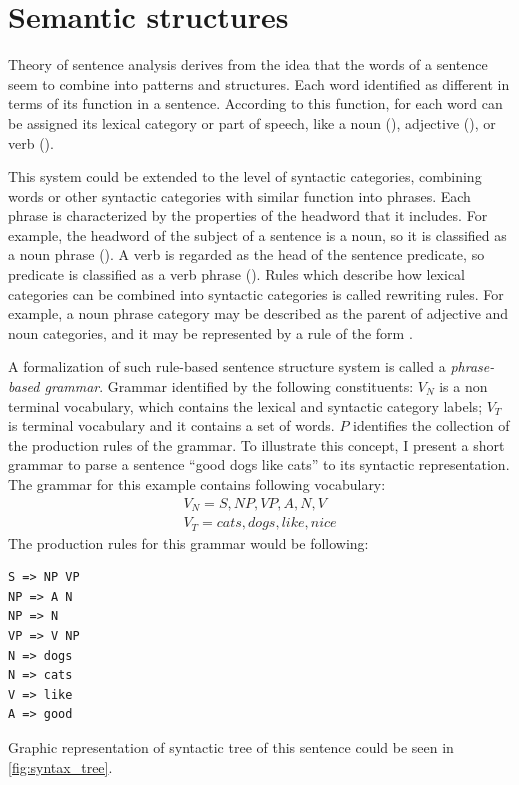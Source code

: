 \section{Semantic structures}
Theory of sentence analysis derives from the idea that the words of a sentence seem to combine into patterns and structures. Each word identified as different in terms of its function in a sentence. According to this function, for each word can be assigned its lexical category or part of speech, like a noun (), adjective (), or verb (). 

This system could be extended to the level of syntactic categories, combining words or other syntactic categories with similar function into phrases. Each phrase is characterized by the properties of the headword that it includes. For example, the headword of the subject of a sentence is a noun, so it is classified as a noun phrase (). A verb is regarded as the head of the sentence predicate, so predicate is classified as a verb phrase (). Rules which describe how lexical categories can be combined into syntactic categories is called rewriting rules. For example, a noun phrase category may be described as the parent of adjective and noun categories, and it may be represented by a rule of the form . 

A formalization of such rule-based sentence structure system is called a \emph{phrase-based grammar}. Grammar identified by the following constituents:
$V_N$ is a non terminal vocabulary, which contains the lexical and syntactic category labels;
$V_T$ is terminal vocabulary and it contains a set of words.
$P$ identifies the collection of the production rules of the grammar.
To illustrate this concept, I present a short grammar to parse a sentence "`good dogs like cats"' to its syntactic representation. The grammar for this example contains following vocabulary:
\begin{equation}
\begin{split}
V_N = {S, NP, VP, A, N, V}\\
V_T = {cats, dogs, like, nice}
\end{split}
\end{equation}
The production rules for this grammar would be following:
\begin{verbatim}
S => NP VP
NP => A N
NP => N
VP => V NP
N => dogs
N => cats
V => like
A => good
\end{verbatim}
Graphic representation of syntactic tree  of this sentence could be seen in \ref{fig:syntax_tree}.

